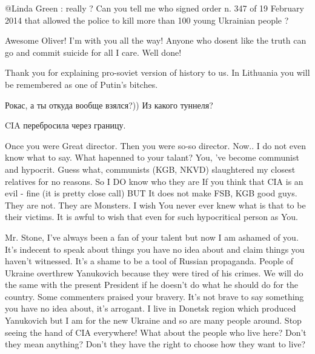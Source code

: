 \begin{itemize}
\begin{itemize}

@Linda Green : really ? Can you tell me who signed order n. 347 of 19 February
2014 that allowed the police to kill more than 100 young Ukrainian people ?


\end{itemize} %

Awesome Oliver! I'm with you all the way! Anyone who dosent like the truth can
go and commit suicide for all I care. Well done!



Thank you for explaining pro-soviet version of history to us. In Lithuania you
will be remembered as one of Putin's bitches.

\begin{itemize} %
Рокас, а ты откуда вообще взялся?)) Из какого туннеля?

CIA перебросила через границу.
\end{itemize} %


Once you were Great director. Then you were so-so director. Now.. I do not even
know what to say. What hapenned to your talant? You, 've become communist and
hypocrit. Guess what, communists (KGB, NKVD) slaughtered my closest relatives
for no reasons. So I DO know who they are If you think that CIA is an evil -
fine (it is pretty close call) BUT It does not make FSB, KGB good guys. They
are not. They are Monsters. I wish You never ever knew what is that to be their
victims. It is awful to wish that even for such hypocritical person as You.



Mr. Stone, I've always been a fan of your talent but now I am ashamed of you.
It's indecent to speak about things you have no idea about and claim things you
haven't witnessed. It's a shame to be a tool of Russian propaganda. People of
Ukraine overthrew Yanukovich because they were tired of his crimes. We will do
the same with the present President if he doesn't do what he should do for the
country. Some commenters praised your bravery. It's not brave to say something
you have no idea about, it's arrogant. I live in Donetsk region which produced
Yanukovich but I am for the new Ukraine and so are many people around. Stop
seeing the hand of CIA everywhere! What about the people who live here? Don't
they mean anything? Don't they have the right to choose how they want to live?


\end{itemize}
